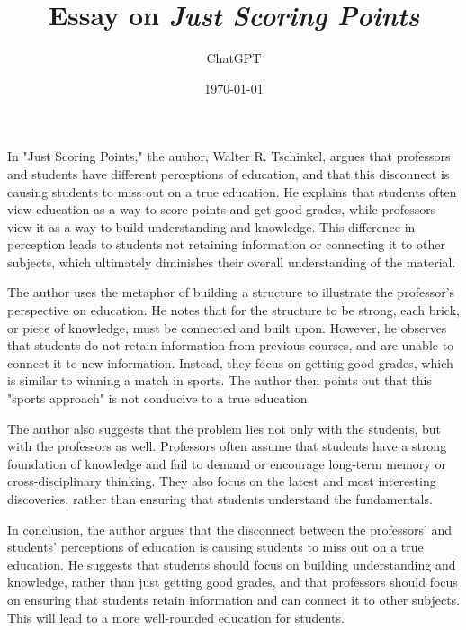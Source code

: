 \documentclass[12pt]{article}
\title{Essay on \emph{Just Scoring Points}}
\author{ChatGPT}
\date{\today}
\begin{document}
\maketitle
In "Just Scoring Points," the author, Walter R. Tschinkel, argues
that professors and students have different perceptions of education,
and that this disconnect is causing students to miss out on a true
education. He explains that students often view education as a way
to score points and get good grades, while professors view it as a
way to build understanding and knowledge. This difference in
perception leads to students not retaining information or connecting
it to other subjects, which ultimately diminishes their overall
understanding of the material.

The author uses the metaphor of building a structure to illustrate
the professor's perspective on education. He notes that for the
structure to be strong, each brick, or piece of knowledge, must be
connected and built upon. However, he observes that students do not
retain information from previous courses, and are unable to connect
it to new information. Instead, they focus on getting good grades,
which is similar to winning a match in sports. The author then
points out that this "sports approach" is not conducive to a true
education.

The author also suggests that the problem lies not only with the
students, but with the professors as well. Professors often assume
that students have a strong foundation of knowledge and fail to
demand or encourage long-term memory or cross-disciplinary thinking.
They also focus on the latest and most interesting discoveries,
rather than ensuring that students understand the fundamentals.

In conclusion, the author argues that the disconnect between the
professors' and students' perceptions of education is causing
students to miss out on a true education. He suggests that students
should focus on building understanding and knowledge, rather than
just getting good grades, and that professors should focus on
ensuring that students retain information and can connect it to
other subjects. This will lead to a more well-rounded education for
students.
\end{document}
